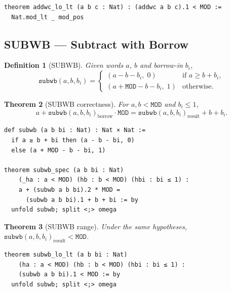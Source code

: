 \documentclass[11pt,a4paper]{article}
\newtheorem{theorem}{Theorem}[section]
\newtheorem{definition}[theorem]{Definition}
\begin{document}
\begin{lstlisting}[style=lean,caption={ADDWC range bound}]
theorem addwc_lo_lt (a b c : Nat) : (addwc a b c).1 < MOD :=
  Nat.mod_lt _ mod_pos
\end{lstlisting}

\subsection{SUBWB --- Subtract with Borrow}

\begin{definition}[SUBWB]
Given words $a$, $b$ and borrow-in $b_i$,
\[
  \mathtt{subwb}(a, b, b_i) =
  \begin{cases}
    (a - b - b_i,\; 0) & \text{if } a \geq b + b_i, \\
    (a + \mathtt{MOD} - b - b_i,\; 1) & \text{otherwise}.
  \end{cases}
\]
\end{definition}

\begin{theorem}[SUBWB correctness]
\label{thm:subwb}
For $a, b < \mathtt{MOD}$ and $b_i \leq 1$,
\[
  a + \mathtt{subwb}(a,b,b_i)_{\mathrm{borrow}} \cdot \mathtt{MOD}
  = \mathtt{subwb}(a,b,b_i)_{\mathrm{result}} + b + b_i.
\]
\end{theorem}

\begin{lstlisting}[style=lean,caption={SUBWB definition and correctness}]
def subwb (a b bi : Nat) : Nat × Nat :=
  if a ≥ b + bi then (a - b - bi, 0)
  else (a + MOD - b - bi, 1)

theorem subwb_spec (a b bi : Nat)
    (_ha : a < MOD) (hb : b < MOD) (hbi : bi ≤ 1) :
    a + (subwb a b bi).2 * MOD =
      (subwb a b bi).1 + b + bi := by
  unfold subwb; split <;> omega
\end{lstlisting}

\begin{theorem}[SUBWB range]
\label{thm:subwb-range}
Under the same hypotheses, $\mathtt{subwb}(a,b,b_i)_{\mathrm{result}} < \mathtt{MOD}$.
\end{theorem}

\begin{lstlisting}[style=lean,caption={SUBWB range bound}]
theorem subwb_lo_lt (a b bi : Nat)
    (ha : a < MOD) (hb : b < MOD) (hbi : bi ≤ 1) :
    (subwb a b bi).1 < MOD := by
  unfold subwb; split <;> omega
\end{lstlisting}
\end{document}
